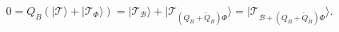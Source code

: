 \begin{equation} 
 0 = Q_B(|\mathcal{T}\rangle + |\mathcal{T}_{\Phi}\rangle) =  
  |\mathcal{T}_{\mathcal{B}}\rangle +
|\mathcal{T}_{(Q_B+\tilde{Q}_B) \Phi}\rangle  = 
|\mathcal{T}_{\mathcal{B}+(Q_B+\tilde{Q}_B) \Phi}\rangle.
\end{equation} 
